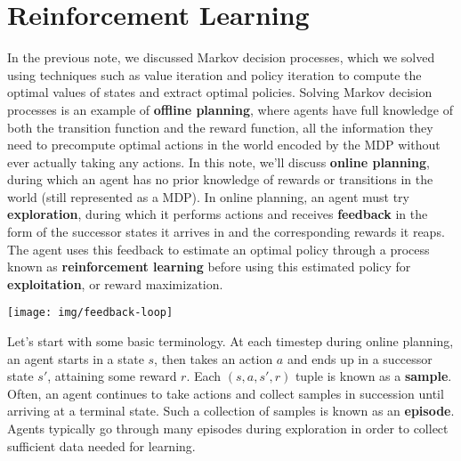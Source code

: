 \documentclass[11pt,fleqn]{article}
\def\title{Note \the\lecturenumber}
\begin{document}
\maketitle


\iffalse
\documentclass[11pt,fleqn]{article}
\usepackage{latexsym,epsf,amsmath,amsfonts,graphicx,url}

\title{Note 5}

\newcommand{\F}{\mathbb{F}}
\newcommand{\Z}{\mathbb{Z}}
\newcommand{\Q}{\mathbb{Q}}
\newcommand{\R}{\mathbb{R}}
\newcommand{\C}{\mathbb{C}}

\begin{document}

\maketitle
\fi

\section*{Reinforcement Learning}
In the previous note, we discussed Markov decision processes, which we solved using techniques such as value iteration and policy iteration to compute the optimal values of states and extract optimal policies. Solving Markov decision processes is an example of \textbf{offline planning}, where agents have full knowledge of both the transition function and the reward function, all the information they need to precompute optimal actions in the world encoded by the MDP without ever actually taking any actions. In this note, we'll discuss \textbf{online planning}, during which an agent has no prior knowledge of rewards or transitions in the world (still represented as a MDP). In online planning, an agent must try \textbf{exploration}, during which it performs actions and receives \textbf{feedback} in the form of the successor states it arrives in and the corresponding rewards it reaps. The agent uses this feedback to estimate an optimal policy through a process known as \textbf{reinforcement learning} before using this estimated policy for \textbf{exploitation}, or reward maximization.
\begin{center}	
	\texttt{[image: img/feedback-loop]}
\end{center}
Let's start with some basic terminology. At each timestep during online planning, an agent starts in a state $s$, then takes an action $a$ and ends up in a successor state $s'$, attaining some reward $r$. Each $(s, a, s', r)$ tuple is known as a \textbf{sample}. Often, an agent continues to take actions and collect samples in succession until arriving at a terminal state. Such a collection of samples is known as an \textbf{episode}. Agents typically go through many episodes during exploration in order to collect sufficient data needed for learning.


\end{document}
\end{document}
